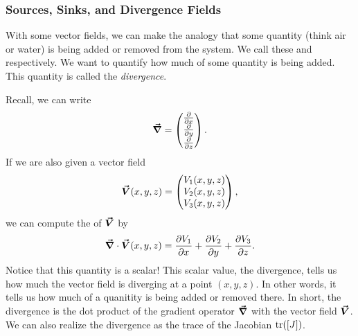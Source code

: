 		        \subsubsection{Sources, Sinks, and Divergence Fields}
		        With some vector fields, we can make the analogy that some quantity (think air or water) is being added or removed from the system.  We call these  and  respectively.  We want to quantify how much of some quantity is being added. This quantity is called the \emph{divergence}.

		        Recall, we can write
		        \[
		        \boldsymbol{\vec{\nabla}} = \begin{pmatrix} \frac{\partial}{\partial x} \\ \frac{\partial}{\partial y} \\ \frac{\partial}{\partial z} \end{pmatrix}.
		        \]
		        If we are also given a vector field
		        \[
		        \boldsymbol{\vec{V}}(x,y,z) = \begin{pmatrix} V_1(x,y,z) \\ V_2(x,y,z) \\ V_3(x,y,z) \end{pmatrix},
		        \]
		        we can compute the  of $\boldsymbol{\vec{V}}$ by
		        \[
		        \boldsymbol{\vec{\nabla}} \cdot \boldsymbol{\vec{V}}(x,y,z) = \frac{\partial V_1}{\partial x} + \frac{\partial V_2}{\partial y} + \frac{\partial V_3}{\partial z}.
		        \]
		        Notice that this quantity is a scalar!  This scalar value, the divergence, tells us how much the vector field is diverging at a point $(x,y,z)$. In other words, it tells us how much of a quanitity is being added or removed there.  In short, the divergence is the dot product of the gradient operator $\boldsymbol{\vec{\nabla}}$ with the vector field $\boldsymbol{\vec{V}}$.  We can also realize the divergence as the trace of the Jacobian $\mathrm{tr}([J])$.


